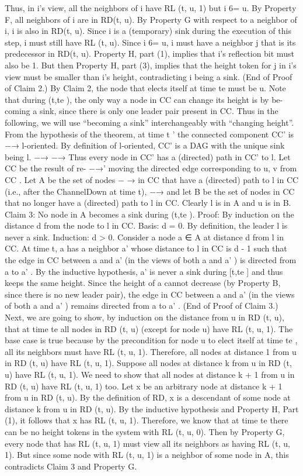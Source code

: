Thus, in i’s view, all the neighbors of i have RL (t, u, 1) but i 6= u. By Property F, all neighbors of i are in RD(t, u). By Property G with respect to a neighbor of i, i is also in RD(t, u). Since i is a (temporary) sink during the execution of this step, i must still have RL (t, u). Since i 6= u, i must have a neighbor j that is its predecessor in RD(t, u). Property H, part (1), implies that i’s reflection bit must also be 1. But then Property H, part (3), implies that the height token for j in i’s view must be smaller than i’s height, contradicting i being a sink. (End of Proof of Claim 2.) By Claim 2, the node that elects itself at time te must be u. Note that during (t,te ), the only way a node in CC can change its height is by be- coming a sink, since there is only one leader pair present in CC. Thus in the following, we will use “becoming a sink” interchangeably with “changing height”. From the hypothesis of the theorem, at time t ' the connected component CC' is −→ l-oriented. By definition of l-oriented, CC' is a DAG with the unique sink being l. −→ −→ Thus every node in CC' has a (directed) path in CC' to l. Let CC be the result of re- −→' moving the directed edge corresponding to {u, v} from CC . Let A be the set of nodes − → in CC that have a (directed) path to l in CC (i.e., after the ChannelDown at time t), −→ and let B be the set of nodes in CC that no longer have a (directed) path to l in CC. Clearly l is in A and u is in B. Claim 3: No node in A becomes a sink during (t,te ). Proof: By induction on the distance d from the node to l in CC. Basis: d = 0. By definition, the leader l is never a sink. Induction: d > 0. Consider a node a ∈ A at distance d from l in CC. At time t, a has a neighbor a' whose distance to l in CC is d - 1 such that the edge in CC between a and a' (in the views of both a and a' ) is directed from a to a' . By the inductive hypothesis, a' is never a sink during [t,te ] and thus keeps the same height. Since the height of a cannot decrease (by Property B, since there is no new leader pair), the edge in CC between a and a' (in the views of both a and a' ) remains directed from a to a' . (End of Proof of Claim 3.) Next, we are going to show, by induction on the distance from u in RD (t, u), that at time te all nodes in RD (t, u) (except for node u) have RL (t, u, 1). The base case is true because by the precondition for node u to elect itself at time te , all its neighbors must have RL (t, u, 1). Therefore, all nodes at distance 1 from u in RD (t, u) have RL (t, u, 1). Suppose all nodes at distance k from u in RD (t, u) have RL (t, u, 1). We need to show that all nodes at distance k + 1 from u in RD (t, u) have RL (t, u, 1) too. Let x be an arbitrary node at distance k + 1 from u in RD (t, u). By the definition of RD, x is a descendant of some node at distance k from u in RD (t, u). By the inductive hypothesis and Property H, Part (1), it follows that x has RL (t, u, 1). Therefore, we know that at time te there can be no height tokens in the system with RL (t, u, 0). Then by Property G, every node that has RL (t, u, 1) must view all its neighbors as having RL (t, u, 1). But since some node with RL (t, u, 1) is a neighbor of some node in A, this contradicts Claim 3 and Property G.
